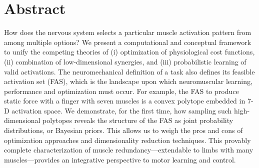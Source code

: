 \documentclass[10pt,letterpaper]{article}
\begin{document}
\section*{Abstract}
How does the nervous system selects a particular muscle activation pattern from among multiple options?
We present a computational and conceptual framework to unify the competing theories of (i) optimization of physiological cost functions, (ii) combination of low-dimensional synergies, and (iii) probabilistic learning of valid activations.
The neuromechanical definition of a task also defines its feasible activation set (FAS), which is the landscape upon which neuromuscular learning, performance and optimization must occur.
For example, the FAS to produce static force with a finger with seven muscles is a convex polytope embedded in 7-D activation space.
We demonstrate, for the first time, how sampling such high-dimensional polytopes reveals the structure of the FAS as joint probability distributions, or Bayesian priors.
This allows us to weigh the pros and cons of optimization approaches and dimensionality reduction techniques.
This provably complete characterization of muscle redundancy---extendable to limbs with many muscles---provides an integrative perspective to motor learning and control.

\end{document}
